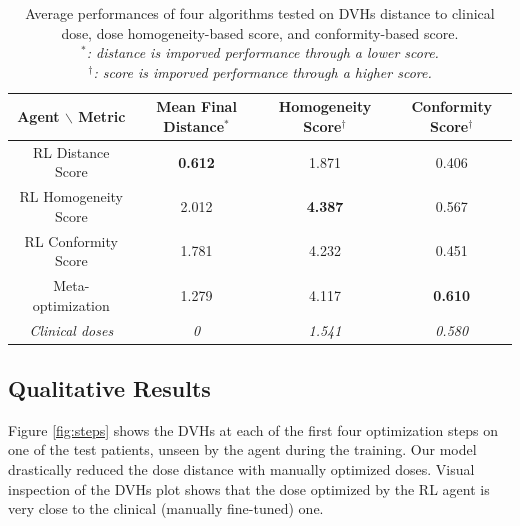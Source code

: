 \begin{table}
	\begin{center}
		\begin{tabular}{| c || c | c | c |} 
			\hline
			Agent $\backslash$ Metric & Mean Final Distance$^*$ & Homogeneity Score$^\dagger$ & Conformity Score$^\dagger$ \\ 
			\hline
			RL Distance Score & \textbf{0.612} & 1.871 & 0.406 \\ 
			RL Homogeneity Score & 2.012 & \textbf{4.387} & 0.567 \\
			RL Conformity Score &  1.781  & 4.232 & 0.451 \\
			Meta-optimization & 1.279 & 4.117 & \textbf{0.610} \\
			\textit{Clinical doses} & \textit{0} & \textit{1.541} & \textit{0.580} \\	
			\hline
		\end{tabular}
		\label{table:results}
	\end{center}
	\caption{
		Average performances of four algorithms tested on DVHs distance to clinical dose, dose homogeneity-based score, and conformity-based score.\\
		\textit{$^*$: distance is imporved performance through a lower score.} \\
		\textit{$^\dagger$: score is imporved performance through a higher score.}
	}
\end{table}

\subsection{Qualitative Results}
Figure \ref{fig:steps} shows the DVHs at each of the first four optimization steps on one of the test patients, unseen by the agent during the training.
Our model drastically reduced the dose distance with manually optimized doses.
Visual inspection of the DVHs plot shows that the dose optimized by the RL agent is very close to the clinical (manually fine-tuned) one.

